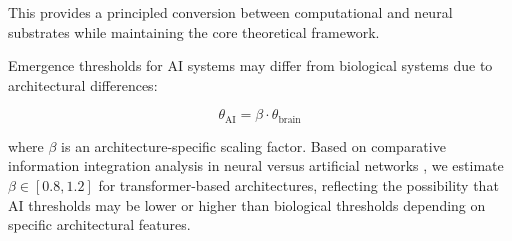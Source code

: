 \documentclass[12pt]{article}
\begin{document}
This provides a principled conversion between computational and neural substrates while maintaining the core theoretical framework.

Emergence thresholds for AI systems may differ from biological systems due to architectural differences:

\begin{equation}
\theta_{\text{AI}} = \beta \cdot \theta_{\text{brain}}
\end{equation}

where $\beta$ is an architecture-specific scaling factor. Based on comparative information integration analysis in neural versus artificial networks \cite{tononi2016,oizumi2014}, we estimate $\beta \in [0.8, 1.2]$ for transformer-based architectures, reflecting the possibility that AI thresholds may be lower or higher than biological thresholds depending on specific architectural features.
\end{document}
